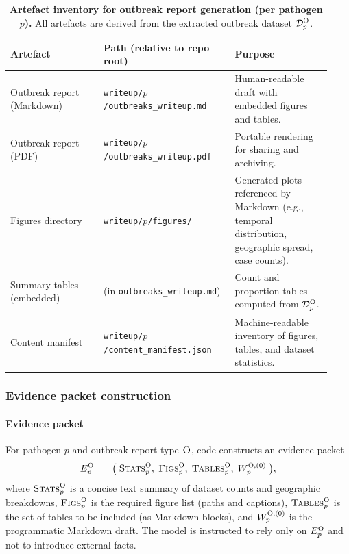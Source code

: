 \begin{table}[h]
\centering
\caption{\textbf{Artefact inventory for outbreak report generation (per pathogen $p$).} All artefacts are derived from the extracted outbreak dataset $\mathcal{D}^{\textsc{O}}_p$.}
\label{tab:artifact_inventory_outbreaks}
\footnotesize
\begin{tabular}{p{0.27\linewidth}p{0.38\linewidth}p{0.28\linewidth}}
\toprule
\textbf{Artefact} & \textbf{Path (relative to repo root)} & \textbf{Purpose} \\
\midrule
Outbreak report (Markdown) &
\texttt{writeup/}$p$\texttt{/outbreaks\_writeup.md} &
Human-readable draft with embedded figures and tables. \\
Outbreak report (PDF) &
\texttt{writeup/}$p$\texttt{/outbreaks\_writeup.pdf} &
Portable rendering for sharing and archiving. \\
Figures directory &
\texttt{writeup/}$p$\texttt{/figures/} &
Generated plots referenced by Markdown (e.g., temporal distribution, geographic spread, case counts). \\
Summary tables (embedded) &
(in \texttt{outbreaks\_writeup.md}) &
Count and proportion tables computed from $\mathcal{D}^{\textsc{O}}_p$. \\
Content manifest &
\texttt{writeup/}$p$\texttt{/content\_manifest.json} &
Machine-readable inventory of figures, tables, and dataset statistics. \\
\bottomrule
\end{tabular}
\end{table}

\subsubsection*{Evidence packet construction}
\paragraph{Evidence packet}
For pathogen $p$ and outbreak report type $\textsc{O}$, code constructs an evidence packet
\[
E^{\textsc{O}}_p \;=\; \big(\;\textsc{Stats}^{\textsc{O}}_p,\;\textsc{Figs}^{\textsc{O}}_p,\;\textsc{Tables}^{\textsc{O}}_p,\;W^{\textsc{O},(0)}_p\;\big),
\]
where $\textsc{Stats}^{\textsc{O}}_p$ is a concise text summary of dataset counts and geographic breakdowns, $\textsc{Figs}^{\textsc{O}}_p$ is the required figure list (paths and captions), $\textsc{Tables}^{\textsc{O}}_p$ is the set of tables to be included (as Markdown blocks), and $W^{\textsc{O},(0)}_p$ is the programmatic Markdown draft.
The model is instructed to rely only on $E^{\textsc{O}}_p$ and not to introduce external facts.

